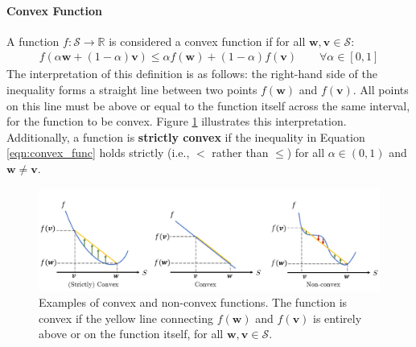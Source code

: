 \documentclass[11pt]{article}
\begin{document}
\paragraph{Convex Function}
A function $f : \mathcal{S} \rightarrow \mathbb{R}$ is considered a convex function if for all $\boldsymbol{w}, \boldsymbol{v} \in \mathcal{S}$:
\begin{align}
    f(\alpha \boldsymbol{w} + (1 - \alpha) \boldsymbol{v}) \leq \alpha f(\boldsymbol{w}) + (1 - \alpha) f(\boldsymbol{v}) \quad \quad \forall \alpha \in [0,1]
    \label{eqn:convex_func}
\end{align}
The interpretation of this definition is as follows: the right-hand side of the inequality forms a straight line between two points $f(\boldsymbol{w})$ and $f(\boldsymbol{v})$. All points on this line must be above or equal to the function itself across the same interval, for the function to be convex. Figure \ref{fig:convex_func} illustrates this interpretation.
Additionally, a function is \textbf{strictly convex} if the inequality in Equation \ref{eqn:convex_func} holds strictly (i.e., $<$ rather than $\leq$) for all $\alpha \in (0,1)$ and $\boldsymbol{w}\neq\boldsymbol{v}$.
\begin{figure}[h]
\includegraphics[width=\textwidth]{imgs/convec_func.png}
\centering
\caption{Examples of convex and non-convex functions. The function is convex if the yellow line connecting $f(\boldsymbol{w})$ and $f(\boldsymbol{v})$ is entirely above or on the function itself, for all $\boldsymbol{w}, \boldsymbol{v} \in \mathcal{S}$.}
\label{fig:convex_func}
\end{figure}
\end{document}
